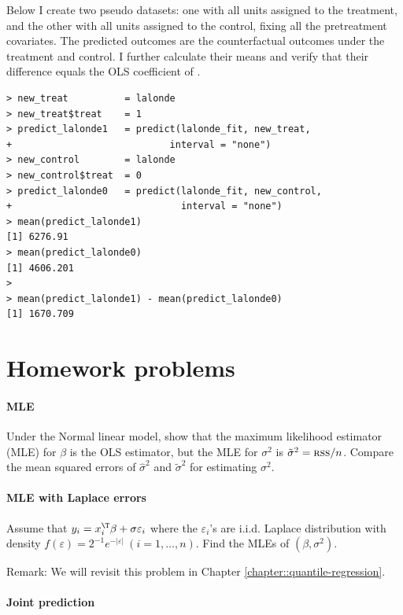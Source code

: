 Below I create two pseudo datasets: one with all units assigned to the treatment, and the other with all units assigned to the control, fixing all the pretreatment covariates. The predicted outcomes are the counterfactual outcomes under the treatment and control. I further calculate their means and verify that their difference equals the OLS coefficient of . 


\begin{lstlisting}
> new_treat          = lalonde
> new_treat$treat    = 1
> predict_lalonde1   = predict(lalonde_fit, new_treat, 
+                            interval = "none")
> new_control        = lalonde
> new_control$treat  = 0
> predict_lalonde0   = predict(lalonde_fit, new_control, 
+                              interval = "none")
> mean(predict_lalonde1)
[1] 6276.91
> mean(predict_lalonde0)
[1] 4606.201
> 
> mean(predict_lalonde1) - mean(predict_lalonde0)
[1] 1670.709
\end{lstlisting}



\section{Homework problems}

\paragraph{MLE}

Under the Normal linear model, show that the maximum likelihood
estimator (MLE) for $\beta$ is the OLS estimator, but the MLE for
$\sigma^{2}$ is $\tilde{\sigma}^{2}=\textsc{rss}/n$. Compare the
mean squared errors of $\hat{\sigma}^{2}$ and $\tilde{\sigma}^{2}$ for estimating $\sigma^2$. 

\paragraph{MLE with Laplace errors}

Assume that $y_{i}=x_{i}^{\T}\beta+\sigma\varepsilon_{i}$ where the
$\varepsilon_{i}$'s are i.i.d. Laplace distribution with density
$f(\varepsilon)=2^{-1}e^{-|\varepsilon|}\ (i=1,\ldots,n)$. Find the
MLEs of $(\beta,\sigma^{2}).$  


Remark: We will revisit this problem in Chapter \ref{chapter::quantile-regression}. 



\paragraph{Joint prediction}\label{hw5:joint-preduction}

